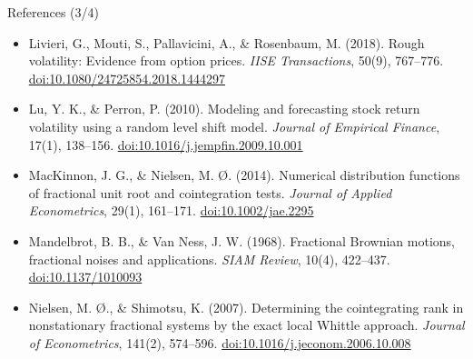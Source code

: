 \begin{frame}{References (3/4)}
\begin{itemize}
    \item Livieri, G., Mouti, S., Pallavicini, A., \& Rosenbaum, M. (2018). Rough volatility: Evidence from option prices. \textit{IISE Transactions}, 50(9), 767--776. \href{https://doi.org/10.1080/24725854.2018.1444297}{doi:10.1080/24725854.2018.1444297}
    \item Lu, Y. K., \& Perron, P. (2010). Modeling and forecasting stock return volatility using a random level shift model. \textit{Journal of Empirical Finance}, 17(1), 138--156. \href{https://doi.org/10.1016/j.jempfin.2009.10.001}{doi:10.1016/j.jempfin.2009.10.001}
    \item MacKinnon, J. G., \& Nielsen, M. Ø. (2014). Numerical distribution functions of fractional unit root and cointegration tests. \textit{Journal of Applied Econometrics}, 29(1), 161--171. \href{https://doi.org/10.1002/jae.2295}{doi:10.1002/jae.2295}
    \item Mandelbrot, B. B., \& Van Ness, J. W. (1968). Fractional Brownian motions, fractional noises and applications. \textit{SIAM Review}, 10(4), 422--437. \href{https://doi.org/10.1137/1010093}{doi:10.1137/1010093}
    \item Nielsen, M. Ø., \& Shimotsu, K. (2007). Determining the cointegrating rank in nonstationary fractional systems by the exact local Whittle approach. \textit{Journal of Econometrics}, 141(2), 574--596. \href{https://doi.org/10.1016/j.jeconom.2006.10.008}{doi:10.1016/j.jeconom.2006.10.008}
\end{itemize}
\end{frame}

